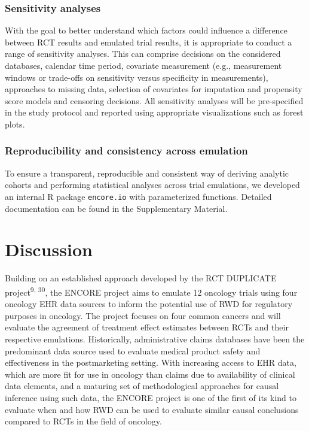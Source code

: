 \documentclass[
  letterpaper,
  DIV=11,
  numbers=noendperiod]{scrartcl}
\begin{document}
\subsubsection{Sensitivity analyses}\label{sensitivity-analyses}

With the goal to better understand which factors could influence a
difference between RCT results and emulated trial results, it is
appropriate to conduct a range of sensitivity analyses. This can
comprise decisions on the considered databases, calendar time period,
covariate measurement (e.g., measurement windows or trade-offs on
sensitivity versus specificity in measurements), approaches to missing
data, selection of covariates for imputation and propensity score models
and censoring decisions. All sensitivity analyses will be pre-specified
in the study protocol and reported using appropriate visualizations such
as forest plots.

\subsubsection{Reproducibility and consistency across
emulation}\label{reproducibility-and-consistency-across-emulation}

To ensure a transparent, reproducible and consistent way of deriving
analytic cohorts and performing statistical analyses across trial
emulations, we developed an internal R package \texttt{encore.io} with
parameterized functions. Detailed documentation can be found in the
Supplementary Material.

\newpage{}

\section{Discussion}\label{discussion}

Building on an established approach developed by the RCT DUPLICATE
project\textsuperscript{9, 30}, the ENCORE project aims to emulate 12
oncology trials using four oncology EHR data sources to inform the
potential use of RWD for regulatory purposes in oncology. The project
focuses on four common cancers and will evaluate the agreement of
treatment effect estimates between RCTs and their respective emulations.
Historically, administrative claims databases have been the predominant
data source used to evaluate medical product safety and effectiveness in
the postmarketing setting. With increasing access to EHR data, which are
more fit for use in oncology than claims due to availability of clinical
data elements, and a maturing set of methodological approaches for
causal inference using such data, the ENCORE project is one of the first
of its kind to evaluate when and how RWD can be used to evaluate similar
causal conclusions compared to RCTs in the field of oncology.
\end{document}
